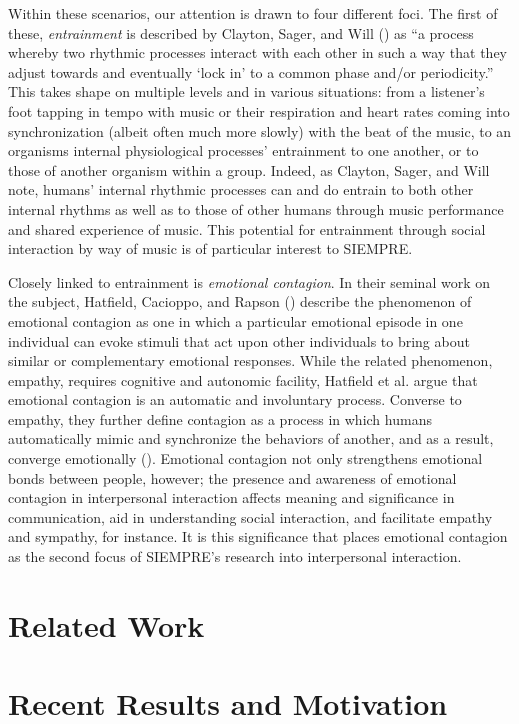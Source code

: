 \documentclass{sig-alternate}
\begin{document}
Within these scenarios, our attention is drawn to four different foci.  The first of these, \textit{entrainment} is described by Clayton, Sager, and Will (\cite{Clayton:2005wc}) as ``a process whereby two rhythmic processes interact with each other in such a way that they adjust towards and eventually `lock in' to a common phase and/or periodicity.''  This takes shape on multiple levels and in various situations: from a listener's foot tapping in tempo with music or their respiration and heart rates coming into synchronization (albeit often much more slowly) with the beat of the music, to an organisms internal physiological processes' entrainment to one another, or to those of another organism within a group.  Indeed, as Clayton, Sager, and Will note, humans' internal rhythmic processes can and do entrain to both other internal rhythms as well as to those of other humans through music performance and shared experience of music.  This potential for entrainment through social interaction by way of music is of particular interest to SIEMPRE.

Closely linked to entrainment is \textit{emotional contagion}.  In their seminal work on the subject, Hatfield, Cacioppo, and Rapson (\cite{Hatfield:1994us}) describe the phenomenon of emotional contagion as one in which a particular emotional episode in one individual can evoke stimuli that act upon other individuals to bring about similar or complementary emotional responses.  While the related phenomenon, empathy, requires cognitive and autonomic facility, Hatfield et al. argue that emotional contagion is an automatic and involuntary process.  Converse to empathy, they further define contagion as a process in which humans automatically mimic and synchronize the behaviors of another, and as a result, converge emotionally (\cite{Hatfield:1992us}).  Emotional contagion not only strengthens emotional bonds between people, however; the presence and awareness of emotional contagion in interpersonal interaction affects meaning and significance in communication, aid in understanding social interaction, and facilitate empathy and sympathy, for instance.  It is this significance that places emotional contagion as the second focus of SIEMPRE's research into interpersonal interaction.



\section{Related Work}

\section{Recent Results and Motivation}
\end{document}
